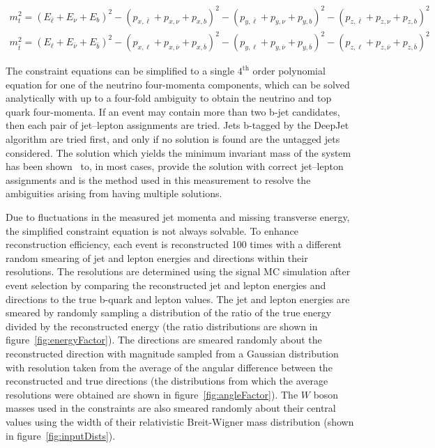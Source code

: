 \begin{linenomath*}
\begin{align}
m_t^2 =\left(E_{\bar{\ell}}+E_\nu+E_b\right)^2-\left(p_{x, \bar{\ell}}+p_{x, \nu}+p_{x, b}\right)^2 -\left(p_{y, \bar{\ell}}+p_{y, \nu}+p_{y, b}\right)^2-\left(p_{z, \bar{\ell}}+p_{z, \nu}+p_{z, b}\right)^2 \\
m_{\bar{t}}^2 =\left(E_{\ell}+E_{\bar{\nu}}+E_{\bar{b}}\right)^2-\left(p_{x, \ell}+p_{x, \bar{\nu}}+p_{x, \bar{b}}\right)^2 -\left(p_{y, \ell}+p_{y, \bar{\nu}}+p_{y, \bar{b}}\right)^2-\left(p_{z, \ell}+p_{z, \bar{\nu}}+p_{z, \bar{b}}\right)^2
\end{align}
\end{linenomath*}
The constraint equations can be simplified to a single $4^{\text{th}}$ order polynomial equation for one of the neutrino four-momenta components, which can be solved analytically with up to a four-fold ambiguity to obtain the neutrino and top quark four-momenta.
If an event may contain more than two b-jet candidates, then each pair of jet--lepton assignments are tried.
Jets b-tagged by the DeepJet algorithm are tried first, and only if no solution is found are the untagged jets considered.
The solution which yields the minimum invariant mass of the \ttbar system has been shown~\cite{PhysRevD.73.112006} to, in most cases, provide the solution with correct jet--lepton assignments and is the method used in this measurement to resolve the ambiguities arising from having multiple solutions.

Due to fluctuations in the measured jet momenta and missing transverse energy, the simplified constraint equation is not always solvable.
To enhance reconstruction efficiency, each event is reconstructed 100 times with a different random smearing of jet and lepton energies and directions within their resolutions.
The resolutions are determined using the signal MC simulation after event selection by comparing the reconstructed jet and lepton energies and directions to the true b-quark and lepton values.
The jet and lepton energies are smeared by randomly sampling a distribution of the ratio of the true energy divided by the reconstructed energy (the ratio distributions are shown in figure~\ref{fig:energyFactor}).
The directions are smeared randomly about the reconstructed direction with magnitude sampled from a Gaussian distribution with resolution taken from the average of the angular difference between the reconstructed and true directions (the distributions from which the average resolutions were obtained are shown in figure~\ref{fig:angleFactor}).
The $W$ boson masses used in the constraints are also smeared randomly about their central values using the width of their relativistic Breit-Wigner mass distribution (shown in figure~\ref{fig:inputDists}).


